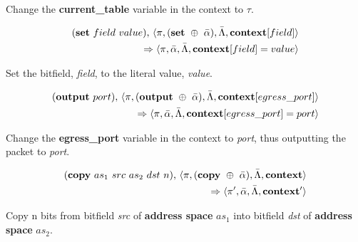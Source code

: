Change the \textbf{current\_table} variable in the context to $\tau$.

\begin{equation}
\begin{split}
  (\textrm{\textbf{set}} \ field \ value) \textrm{,} \ \langle \pi, (\textrm{\textbf{set}} \ \oplus \ \bar \alpha), \bar \Lambda,
  \textbf{\textrm{context}}[field] \rangle \\
  \Rightarrow \langle \pi, \bar \alpha, \bar \Lambda,
  \textbf{\textrm{context}}[field] = value \rangle
\end{split}
\end{equation}

Set the bitfield, \textit{field}, to the literal value, \textit{value}.

\begin{equation}
\begin{split}
  (\textrm{\textbf{output}} \ port) \textrm{,} \ \langle \pi, (\textrm{\textbf{output}} \ \oplus \ \bar \alpha), \bar \Lambda,
  \textbf{\textrm{context}}[egress\_port] \rangle \\
  \Rightarrow 
  \langle \pi, \bar \alpha, \bar \Lambda,
  \textbf{\textrm{context}}[egress\_port] = port \rangle
\end{split}
\end{equation}

Change the \textbf{egress\_port} variable in the context to \textit{port}, thus outputting the packet to \textit{port}.

\begin{equation}
\begin{split}
  (\textrm{\textbf{copy}} \ as_1 \ src \ as_2 \ dst \ n)
  \textrm{,} \ \langle \pi, (\textbf{\textrm{copy}} \ \oplus \ \bar \alpha), \bar \Lambda, \textrm{\textbf{context}} \rangle \\ \Rightarrow
  \langle \pi', \bar \alpha, \bar \Lambda, \textrm{\textbf{context}}' \rangle
\end{split}
\end{equation}

Copy n bits from bitfield \textit{src} of \textbf{address space} $as_1$ into bitfield \textit{dst} of \textbf{address space} $as_2$.

